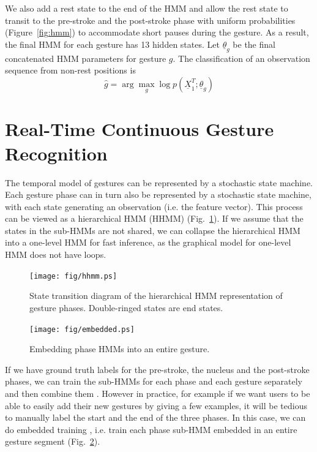 We also add a rest state to the end of the HMM and allow the rest state to transit to the pre-stroke
and the post-stroke phase with uniform probabilities (Figure~\ref{fig:hmm}) to accommodate short pauses during the gesture.
As a result, the final HMM for each gesture has 13 hidden states.
Let $\underline{\theta}_g$ be the final concatenated HMM parameters for gesture $g$. The classification
of an observation sequence from non-rest positions is 
\begin{displaymath}
\hat{g} = \arg\max_g\log p(\underline{X}_1^T; \underline{\theta}_g)
\end{displaymath}


\section{Real-Time Continuous Gesture Recognition}
The temporal model of gestures can be represented by a stochastic state machine.
Each gesture phase can in turn also be represented by a stochastic state
machine, with each state generating an observation (i.e. the feature vector).
This process can be viewed as a hierarchical HMM (HHMM) (Fig.~\ref{fig:hhmm}). If we assume
that the states in the sub-HMMs are not shared, we can collapse the hierarchical HMM
into a one-level HMM for fast inference, as the graphical model for one-level
HMM does not have loops.

\begin{figure}[!t]
\centering
\texttt{[image: fig/hhmm.ps]}
\caption{State transition diagram of the hierarchical HMM representation of
gesture phases. Double-ringed states are end states.}
\label{fig:hhmm}
\end{figure}

\begin{figure}[!t]
\centering
\texttt{[image: fig/embedded.ps]}
\caption{Embedding phase HMMs into an entire gesture.}
\label{fig:embed}
\end{figure}

If we have ground truth labels for the pre-stroke, the nucleus and the
post-stroke phases, we can train the sub-HMMs for each phase and each gesture
separately and then combine them \cite{yin13}. However in practice, for example
if we want users to be able to easily add their new gestures by giving a few
examples, it will be tedious to manually label the start and the end of the
three phases. In this case, we can do embedded training \cite{young1994}, i.e.
train each phase sub-HMM embedded in an entire gesture segment
(Fig.~\ref{fig:embed}).

